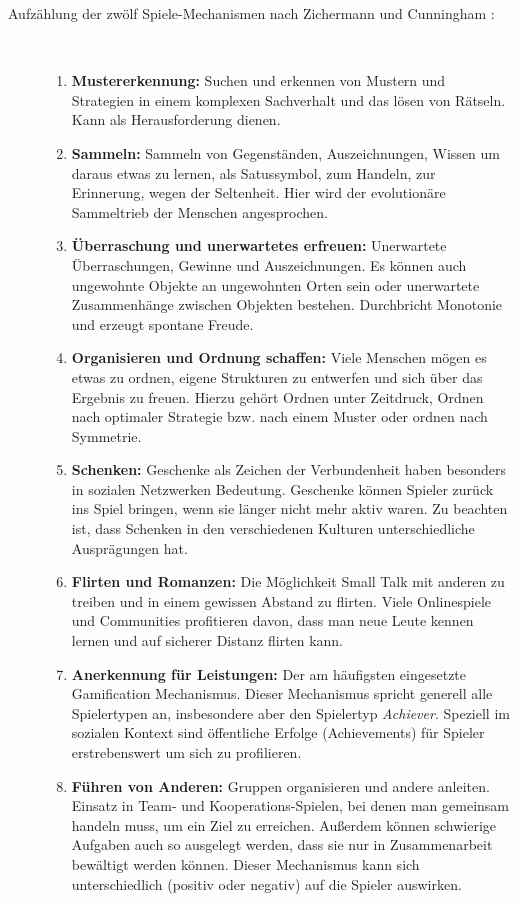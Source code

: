 \documentclass[a4paper,12pt,twoside]{scrartcl}
\begin{document}
\begin{description}
   \item[Aufzählung der zwölf Spiele-Mechanismen nach Zichermann und Cunningham \cite{Zichermann2011} :]~\par
   \begin{enumerate}
      \item \textbf{Mustererkennung:} Suchen und erkennen von Mustern und Strategien in einem komplexen Sachverhalt und das lösen von Rätseln. Kann als Herausforderung dienen.
      \item \textbf{Sammeln:} Sammeln von Gegenständen, Auszeichnungen, Wissen um daraus etwas zu lernen, als Satussymbol, zum Handeln, zur Erinnerung, wegen der Seltenheit. Hier wird der evolutionäre Sammeltrieb der Menschen angesprochen.
      \item \textbf{Überraschung und unerwartetes erfreuen:} Unerwartete Überraschungen, Gewinne und Auszeichnungen. Es können auch ungewohnte Objekte an ungewohnten Orten sein oder unerwartete Zusammenhänge zwischen Objekten bestehen. Durchbricht Monotonie und erzeugt spontane Freude. 
      \item \textbf{Organisieren und Ordnung schaffen:} Viele Menschen mögen es etwas zu ordnen, eigene Strukturen zu entwerfen und sich über das Ergebnis zu freuen. Hierzu gehört Ordnen unter Zeitdruck, Ordnen nach optimaler Strategie bzw. nach einem Muster oder ordnen nach Symmetrie.
      \item \textbf{Schenken:} Geschenke als Zeichen der Verbundenheit haben besonders in sozialen Netzwerken Bedeutung. Geschenke können Spieler zurück ins Spiel bringen, wenn sie länger nicht mehr aktiv waren. Zu beachten ist, dass Schenken in den verschiedenen Kulturen unterschiedliche Ausprägungen hat.
      \item \textbf{Flirten und Romanzen:} Die Möglichkeit Small Talk mit anderen zu treiben und in einem gewissen Abstand zu flirten. Viele Onlinespiele und Communities profitieren davon, dass man neue Leute kennen lernen und auf sicherer Distanz flirten kann.
      \item \textbf{Anerkennung für Leistungen:} Der am häufigsten eingesetzte Gamification Mechanismus. Dieser Mechanismus spricht generell alle Spielertypen an, insbesondere aber den Spielertyp \textit{Achiever}. Speziell im sozialen Kontext sind öffentliche Erfolge (Achievements) für Spieler erstrebenswert um sich zu profilieren.
      \item \textbf{Führen von Anderen:} Gruppen organisieren und andere anleiten. Einsatz in Team- und Kooperations-Spielen, bei denen man gemeinsam handeln muss, um ein Ziel zu erreichen. Außerdem können schwierige Aufgaben auch so ausgelegt werden, dass sie nur in Zusammenarbeit bewältigt werden können. Dieser Mechanismus kann sich unterschiedlich (positiv oder negativ) auf die Spieler auswirken.  

\end{enumerate}
\end{description}
\end{document}
